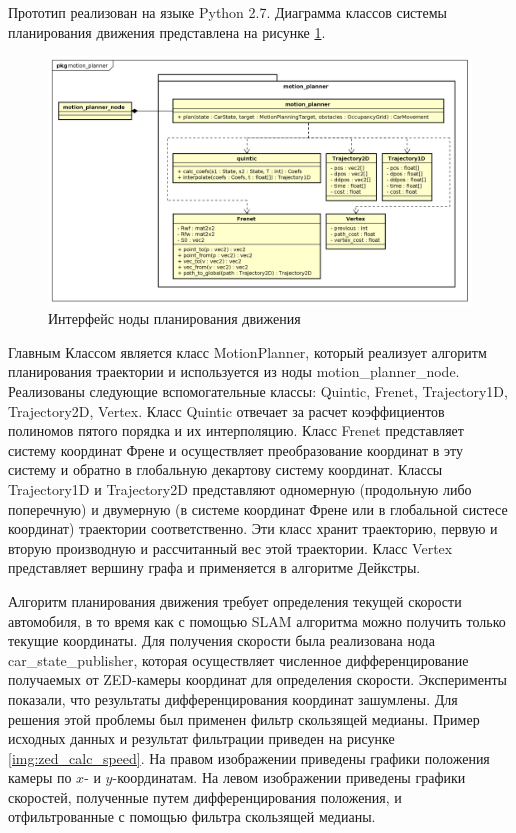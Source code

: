 Прототип реализован на языке Python 2.7. Диаграмма классов системы планирования движения представлена на рисунке
\ref{img:motion_planner_classes}.

\begin{figure}[h]
    \centering
    \includegraphics[width=\linewidth]{images/3_devel/motion_planner_classes}
    \caption{Интерфейс ноды планирования движения}
    \label{img:motion_planner_classes}
\end{figure}

Главным Классом является класс MotionPlanner, который реализует алгоритм планирования траектории и используется
из ноды motion\_planner\_node. Реализованы следующие вспомогательные классы: Quintic, Frenet, Trajectory1D,
Trajectory2D, Vertex. Класс Quintic отвечает за расчет коэффициентов полиномов пятого порядка и их интерполяцию.
Класс Frenet представляет систему координат Френе и осуществляет преобразование координат в эту систему и
обратно в глобальную декартову систему координат. Классы Trajectory1D и Trajectory2D представляют одномерную
(продольную либо поперечную) и двумерную (в системе координат Френе или в глобальной систесе координат) траектории
соответственно. Эти класс хранит траекторию, первую и вторую производную и рассчитанный вес этой траектории.
Класс Vertex представляет вершину графа и применяется в алгоритме Дейкстры.

Алгоритм планирования движения требует определения текущей скорости автомобиля, в то время как с помощью
SLAM алгоритма можно получить только текущие координаты. Для получения скорости была реализована нода car\_state\_publisher,
которая осуществляет численное дифференцирование получаемых от ZED-камеры координат для определения скорости.
Эксперименты показали, что результаты дифференцирования координат зашумлены. Для решения этой проблемы был применен
фильтр скользящей медианы. Пример исходных данных и результат фильтрации приведен на рисунке \ref{img:zed_calc_speed}.
На правом изображении приведены графики положения камеры по $x$- и $y$-координатам. На левом изображении приведены
графики скоростей, полученные путем дифференцирования положения, и отфильтрованные  с помощью фильтра скользящей
медианы.

